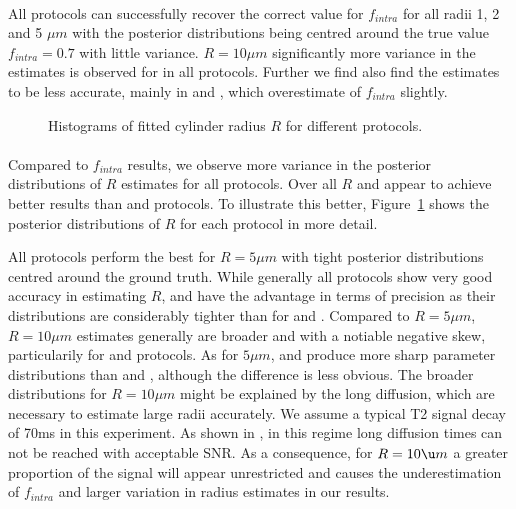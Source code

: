 \paragraph{} All protocols can successfully recover the correct value for $f_{intra}$ for all radii 1, 2 and 5 $\mu m$ with the posterior distributions being centred around the true value $f_{intra}=0.7$ with little variance. $R=10\mu m$ significantly more variance in the estimates is observed for in all protocols. Further we find also find the estimates to be less accurate, mainly in {\SF} and {\SD}, which overestimate of $f_{intra}$ slightly.

\begin{figure}[H]
	 \centering
	 
	 \caption{Histograms of fitted cylinder radius $R$ for different protocols.}
	 \label{fig:chapter7 exp1 histograms 60mT}
\end{figure}

\paragraph{} Compared to $f_{intra}$ results, we observe more variance in the posterior distributions of $R$ estimates for all protocols. Over all $R$ {\DO} and {\FD} appear to achieve better results than {\OI} and {\SD} protocols. To illustrate this better, Figure~\ref{fig:chapter7 exp1 histograms 60mT} shows the posterior distributions of $R$ for each protocol in more detail.

All protocols perform the best for $R=5\mu m$ with tight posterior distributions centred around the ground truth. While generally all protocols show very good accuracy in estimating $R$, {\DO} and {\FD} have the advantage in terms of precision as their distributions are considerably tighter than for {\OI} and {\SD}. Compared to $R=5\mu m$, $R=10\mu m$ estimates generally are broader and with a notiable  negative skew, particularily for {\OI} and {\SD} protocols.  As for $5\mu m$, {\DO} and {\FD} produce more sharp parameter distributions than {\OI} and {\SD}, although the difference is less obvious. The broader distributions for $R=10\mu m$ might be explained by the long diffusion, which are necessary to estimate large radii accurately.  We assume a typical T2 signal decay of 70ms in this experiment. As shown in \citep{Alexander:STEAM} , in this regime long diffusion times can not be reached with acceptable SNR. As a consequence, for $R=10\u m$ a greater proportion of the signal will appear unrestricted and causes the underestimation of $f_{intra}$ and larger variation in radius estimates in our results.

